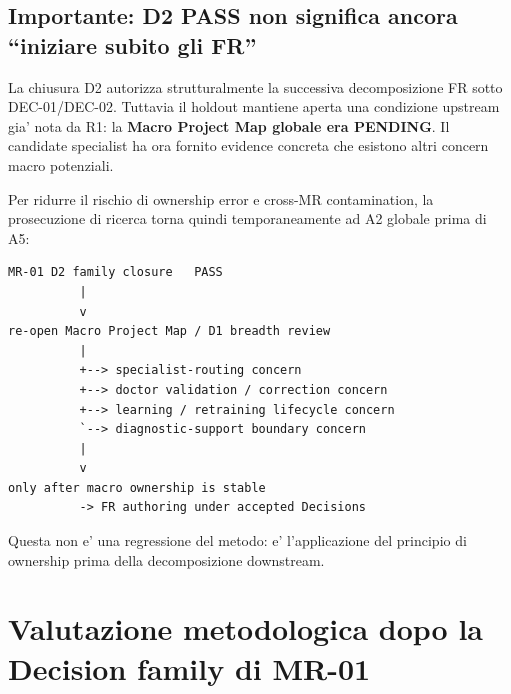 \documentclass[11pt,a4paper]{article}
\begin{document}
\subsection{Importante: D2 PASS non significa ancora ``iniziare subito gli FR''}
La chiusura D2 autorizza strutturalmente la successiva decomposizione FR sotto DEC-01/DEC-02. Tuttavia il holdout mantiene aperta una condizione upstream gia' nota da R1: la \textbf{Macro Project Map globale era PENDING}. Il candidate specialist ha ora fornito evidence concreta che esistono altri concern macro potenziali.

Per ridurre il rischio di ownership error e cross-MR contamination, la prosecuzione di ricerca torna quindi temporaneamente ad A2 globale prima di A5:

\begin{lstlisting}
MR-01 D2 family closure   PASS
          |
          v
re-open Macro Project Map / D1 breadth review
          |
          +--> specialist-routing concern
          +--> doctor validation / correction concern
          +--> learning / retraining lifecycle concern
          `--> diagnostic-support boundary concern
          |
          v
only after macro ownership is stable
          -> FR authoring under accepted Decisions
\end{lstlisting}

Questa non e' una regressione del metodo: e' l'applicazione del principio di ownership prima della decomposizione downstream.

\section{Valutazione metodologica dopo la Decision family di MR-01}
\end{document}
